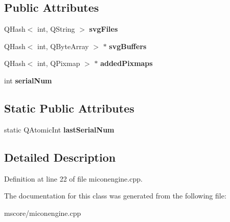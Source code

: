 \subsection*{Public Attributes}
\begin{DoxyCompactItemize}
\item 
\mbox{\label{class_m_icon_engine_private_a2ea75031be980215a549d1a6ac3eda5c}} 
Q\+Hash$<$ int, Q\+String $>$ {\bfseries svg\+Files}
\item 
\mbox{\label{class_m_icon_engine_private_a816ef14016b04d8127f0bb0262eca813}} 
Q\+Hash$<$ int, Q\+Byte\+Array $>$ $\ast$ {\bfseries svg\+Buffers}
\item 
\mbox{\label{class_m_icon_engine_private_a44ebea37b942b7e173e10822934b35dd}} 
Q\+Hash$<$ int, Q\+Pixmap $>$ $\ast$ {\bfseries added\+Pixmaps}
\item 
\mbox{\label{class_m_icon_engine_private_a0f024412839d87411ef3e4fdde97fa26}} 
int {\bfseries serial\+Num}
\end{DoxyCompactItemize}
\subsection*{Static Public Attributes}
\begin{DoxyCompactItemize}
\item 
\mbox{\label{class_m_icon_engine_private_a41a1f081271726c4cdd3c813effe9654}} 
static Q\+Atomic\+Int {\bfseries last\+Serial\+Num}
\end{DoxyCompactItemize}


\subsection{Detailed Description}


Definition at line 22 of file miconengine.\+cpp.



The documentation for this class was generated from the following file\+:\begin{DoxyCompactItemize}
\item 
mscore/miconengine.\+cpp\end{DoxyCompactItemize}
